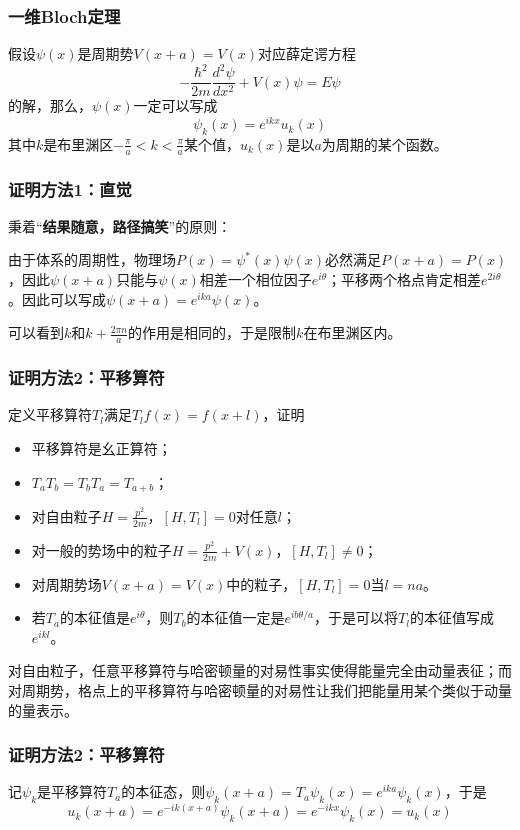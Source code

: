 \documentclass[CJK]{beamer}
\begin{document}
\begin{frame}
\frametitle{\bch 一维Bloch定理 \ech}
\bch
假设$\psi (x) $是周期势$V(x+a) = V(x)$对应薛定谔方程
$$
-\frac{\hbar^2}{2m} \frac{d^2 \psi}{dx^2} + V(x) \psi = E \psi
$$
的解，那么，$\psi (x)$一定可以写成
$$
\psi_k(x) = e^{ikx} u_k(x)
$$
其中$k$是布里渊区$-\frac{\pi}{a} < k < \frac{\pi}{a}$某个值，$u_k(x)$是以$a$为周期的某个函数。
\ech
\end{frame}


\begin{frame}
\frametitle{\bch 证明方法1：直觉 \ech}
\bch
秉着“{\bf 结果随意，路径搞笑}”的原则：\par
由于体系的周期性，物理场$P(x) = \psi^*(x) \psi(x)$必然满足$P(x+a) = P(x)$，因此$\psi(x+a)$只能与$\psi(x)$相差一个相位因子$e^{i\theta}$；平移两个格点肯定相差$e^{2i\theta}$。因此可以写成$\psi(x+a) = e^{ika} \psi(x)$。
\par
可以看到$k$和$k + \frac{2\pi n}{a}$的作用是相同的，于是限制$k$在布里渊区内。
\ech
\end{frame}


\begin{frame}
\frametitle{\bch 证明方法2：平移算符 \ech}
\bch
定义平移算符$T_l$满足$T_l f(x) = f(x+l)$，证明
\begin{itemize}
\item 平移算符是幺正算符；
\item $T_a T_b = T_b T_a = T_{a+b}$；
\item 对自由粒子$H = \frac{p^2}{2m}$，$[H,T_l]=0$对任意$l$；
\item 对一般的势场中的粒子$H = \frac{p^2}{2m} + V(x)$，$[H,T_l] \not= 0$；
\item 对周期势场$V(x+a) = V(x)$中的粒子，$[H,T_{l}] = 0$当$l=na$。
\item 若$T_a$的本征值是$e^{i\theta}$，则$T_{b}$的本征值一定是$e^{ib\theta/a}$，于是可以将$T_l$的本征值写成$e^{ikl}$。
\end{itemize}
对自由粒子，任意平移算符与哈密顿量的对易性事实使得能量完全由动量表征；而对周期势，格点上的平移算符与哈密顿量的对易性让我们把能量用某个类似于动量的量表示。
\ech
\end{frame}

\begin{frame}
\frametitle{\bch 证明方法2：平移算符 \ech}
\bch
记$\psi_k$是平移算符$T_a$的本征态，则$\psi_k(x+a) = T_a \psi_k(x) = e^{ika} \psi_k(x)$，于是
$$
u_k(x+a) = e^{-ik(x+a)} \psi_k (x+a) = e^{-ikx} \psi_k(x) = u_k(x)
$$
\ech
\end{frame}
\end{document}
